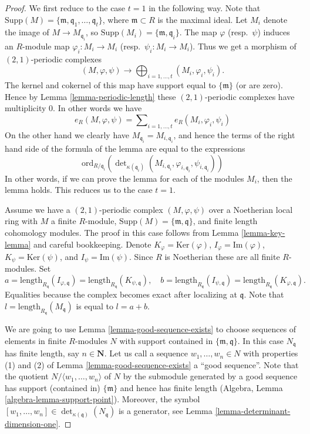 \begin{proof}
We first reduce to the case $t = 1$ in the following way.
Note that
$\text{Supp}(M) = \{\mathfrak m, \mathfrak q_1, \ldots, \mathfrak q_t\}$,
where $\mathfrak m \subset R$ is the maximal ideal.
Let $M_i$ denote the image of $M \to M_{\mathfrak q_i}$,
so $\text{Supp}(M_i) = \{\mathfrak m, \mathfrak q_i\}$.
The map $\varphi$ (resp.\ $\psi$) induces an $R$-module map
$\varphi_i : M_i \to M_i$ (resp.\ $\psi_i : M_i \to M_i$).
Thus we get a morphism of $(2, 1)$-periodic complexes
$$
(M, \varphi, \psi) \longrightarrow
\bigoplus\nolimits_{i = 1, \ldots, t} (M_i, \varphi_i, \psi_i).
$$
The kernel and cokernel of this map have support equal to
$\{\mathfrak m\}$ (or are zero). Hence by Lemma \ref{lemma-periodic-length}
these $(2, 1)$-periodic complexes have multiplicity $0$.
In other words we have
$$
e_R(M, \varphi, \psi) =
\sum\nolimits_{i = 1, \ldots, t}
e_R(M_i, \varphi_i, \psi_i)
$$
On the other hand we clearly have $M_{\mathfrak q_i} = M_{i, \mathfrak q_i}$,
and hence the terms of the right hand side of the formula of the
lemma are equal to the expressions
$$
\text{ord}_{R/\mathfrak q_i}\left(
\det\nolimits_{\kappa(\mathfrak q_i)}
(M_{i, \mathfrak q_i}, \varphi_{i, \mathfrak q_i}, \psi_{i, \mathfrak q_i})
\right)
$$
In other words, if we can prove the lemma for each of the modules
$M_i$, then the lemma holds. This reduces us to the case $t = 1$.

\medskip\noindent
Assume we have a $(2, 1)$-periodic complex $(M, \varphi, \psi)$
over a Noetherian local ring with $M$ a finite $R$-module,
$\text{Supp}(M) = \{\mathfrak m, \mathfrak q\}$, and
finite length cohomology modules. The proof in this case
follows from Lemma \ref{lemma-key-lemma} and careful bookkeeping.
Denote
$K_\varphi = \text{Ker}(\varphi)$,
$I_\varphi = \text{Im}(\varphi)$,
$K_\psi = \text{Ker}(\psi)$, and
$I_\psi = \text{Im}(\psi)$.
Since $R$ is Noetherian these are all finite $R$-modules.
Set
$$
a = \text{length}_{R_{\mathfrak q}}(I_{\varphi, \mathfrak q})
= \text{length}_{R_{\mathfrak q}}(K_{\psi, \mathfrak q}),
\quad
b = \text{length}_{R_{\mathfrak q}}(I_{\psi, \mathfrak q})
= \text{length}_{R_{\mathfrak q}}(K_{\varphi, \mathfrak q}).
$$
Equalities because the complex becomes exact after localizing at
$\mathfrak q$. Note that $l = \text{length}_{R_{\mathfrak q}}(M_{\mathfrak q})$
is equal to $l = a + b$.

\medskip\noindent
We are going to use Lemma \ref{lemma-good-sequence-exists}
to choose sequences of elements in finite $R$-modules
$N$ with support contained in $\{\mathfrak m, \mathfrak q\}$.
In this case $N_{\mathfrak q}$ has finite length, say $n \in \mathbf{N}$.
Let us call a sequence $w_1, \ldots, w_n \in N$
with properties (1) and (2) of Lemma \ref{lemma-good-sequence-exists}
a ``good sequence''. Note that the quotient
$N/\langle w_1, \ldots, w_n \rangle$ of $N$ by the submodule generated by
a good sequence has support (contained in) $\{\mathfrak m\}$
and hence has finite length (Algebra, Lemma \ref{algebra-lemma-support-point}).
Moreover, the symbol
$[w_1, \ldots, w_n] \in \det_{\kappa(\mathfrak q)}(N_{\mathfrak q})$
is a generator, see Lemma \ref{lemma-determinant-dimension-one}.


\end{proof}
